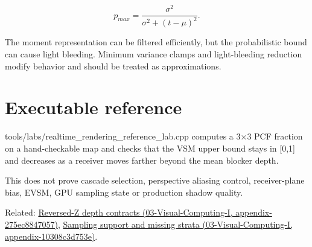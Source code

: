 \[
p_{max}
=
\frac{\sigma^2}
{\sigma^2+(t-\mu)^2}.
\]

The moment representation can be filtered efficiently, but the probabilistic bound can cause light bleeding. Minimum variance clamps and light-bleeding reduction modify behavior and should be treated as approximations.

\section{Executable reference}\label{appendix-7cac8a689849-executable-reference}

tools/labs/realtime\_rendering\_reference\_lab.cpp computes a 3×3 PCF fraction on a hand-checkable map and checks that the VSM upper bound stays in {[}0,1{]} and decreases as a receiver moves farther beyond the mean blocker depth.

This does not prove cascade selection, perspective aliasing control, receiver-plane bias, EVSM, GPU sampling state or production shadow quality.

Related: \href{../03-Visual-Computing-I/main.pdf\#nameddest=appendix-275ec8847057}{Reversed-Z depth contracts (03-Visual-Computing-I, appendix-275ec8847057)}, \href{../03-Visual-Computing-I/main.pdf\#nameddest=appendix-10308c3d753e}{Sampling support and missing strata (03-Visual-Computing-I, appendix-10308c3d753e)}.
